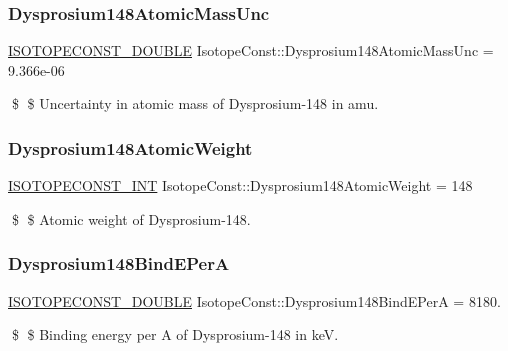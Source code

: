 \subsubsection{\texorpdfstring{Dysprosium148\+Atomic\+Mass\+Unc}{Dysprosium148AtomicMassUnc}}
{\footnotesize\ttfamily \mbox{\hyperlink{group___isotope_const-_macros_ga8f45a7272ce02c0b4c65c44636ed719a}{I\+S\+O\+T\+O\+P\+E\+C\+O\+N\+S\+T\+\_\+\+D\+O\+U\+B\+LE}} Isotope\+Const\+::\+Dysprosium148\+Atomic\+Mass\+Unc = 9.\+366e-\/06}

\$ \$ Uncertainty in atomic mass of Dysprosium-\/148 in amu. \mbox{\label{group___isotope_const-_dysprosium-_dy148_gaf2283a429415f3f4bd0e4ffcc94b1f93}} 
\subsubsection{\texorpdfstring{Dysprosium148\+Atomic\+Weight}{Dysprosium148AtomicWeight}}
{\footnotesize\ttfamily \mbox{\hyperlink{group___isotope_const-_macros_ga5f18360b3e99483a35c32d789e62621c}{I\+S\+O\+T\+O\+P\+E\+C\+O\+N\+S\+T\+\_\+\+I\+NT}} Isotope\+Const\+::\+Dysprosium148\+Atomic\+Weight = 148}

\$ \$ Atomic weight of Dysprosium-\/148. \mbox{\label{group___isotope_const-_dysprosium-_dy148_ga9fc3a4f9b033225d94c310cae42ea97b}} 
\subsubsection{\texorpdfstring{Dysprosium148\+Bind\+E\+PerA}{Dysprosium148BindEPerA}}
{\footnotesize\ttfamily \mbox{\hyperlink{group___isotope_const-_macros_ga8f45a7272ce02c0b4c65c44636ed719a}{I\+S\+O\+T\+O\+P\+E\+C\+O\+N\+S\+T\+\_\+\+D\+O\+U\+B\+LE}} Isotope\+Const\+::\+Dysprosium148\+Bind\+E\+PerA = 8180.}

\$ \$ Binding energy per A of Dysprosium-\/148 in keV. \mbox{\label{group___isotope_const-_dysprosium-_dy148_gacc537bfbf5f9ff2a8914c49eb002b071}} 

